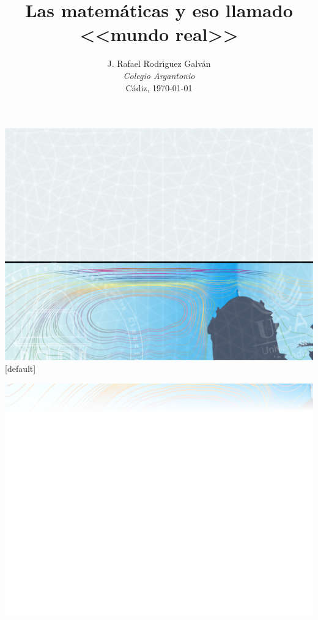 \documentclass[
  unknownkeysallowed %
]{beamer}
\title[C\'adiz Num\'erica 2013]
{Las matemáticas y eso llamado <<mundo real>>}
\author[J. R. Rguez. Galv\'an]{%
  { J. Rafael Rodr\'{\i}guez Galv\'an}
  \\[1.5em]
  {\small \em Colegio Argantonio}
  \\[0.2em]
  {\scriptsize Cádiz, \today}
}
\date{}
\begin{document}

%
%
 {\includegraphics[width=\paperwidth,height=\paperheight]{frontpage_bg}}
[default]

\begin{frame}
  \titlepage
  \vspace{2.5cm}
\end{frame}

%
%

 {\includegraphics[width=\paperwidth,height=\paperheight]{slide_bg}}
\end{document}
